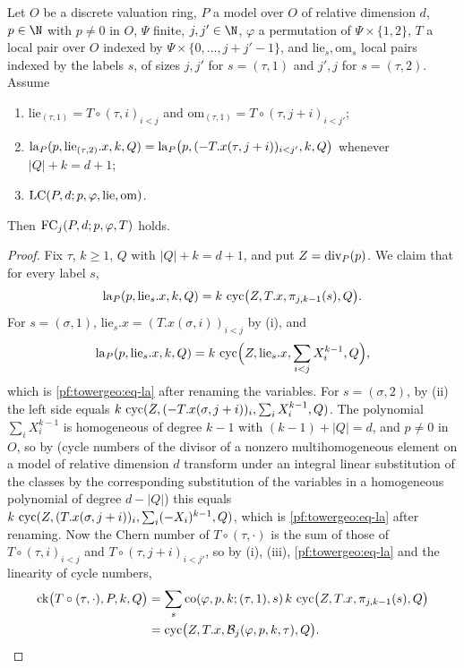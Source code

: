 \begin{lemma}\label{pf:towergeo:flag-from-labels}
Let $O$ be a discrete valuation ring, $P$ a model over $O$ of relative dimension $d$, $p\in\N$ with
$p\ne0$ in $O$, $\Psi$ finite, $j,j'\in\N$, $\varphi$ a permutation of $\Psi\times\{1,2\}$, $T$ a local pair
over $O$ indexed by $\Psi\times\{0,\dots,j+j'-1\}$, and $\mathrm{lie}_s,\mathrm{om}_s$ local pairs indexed by
the labels $s$, of sizes $j,j'$ for $s=(\tau,1)$ and $j',j$ for $s=(\tau,2)$. Assume
\begin{enumerate}[label=(\roman*)]
\item $\mathrm{lie}_{(\tau,1)}=T\circ(\tau,i)_{i<j}$ and $\mathrm{om}_{(\tau,1)}=T\circ(\tau,j+i)_{i<j'}$;
\item $\operatorname{la}_P(p,\mathrm{lie}_{(\tau,2)}.x,k,Q)=\operatorname{la}_P\bigl(p,(-T.x(\tau,j+i))_{i<j'},k,Q\bigr)$
  whenever $|Q|+k=d+1$;
\item $\mathrm{LC}(P,d;p,\varphi,\mathrm{lie},\mathrm{om})$.
\end{enumerate}
Then $\mathrm{FC}_j(P,d;p,\varphi,T)$ holds.
\end{lemma}

\begin{proof}
Fix $\tau$, $k\ge1$, $Q$ with $|Q|+k=d+1$, and put $Z=\operatorname{div}_P(p)$. We claim that for every label
$s$,
\begin{equation}\label{pf:towergeo:eq-la}
\operatorname{la}_P(p,\mathrm{lie}_s.x,k,Q)=k\,\operatorname{cyc}\bigl(Z,T.x,\pi_{j,k-1}(s),Q\bigr).
\end{equation}
For $s=(\sigma,1)$, $\mathrm{lie}_s.x=(T.x(\sigma,i))_{i<j}$ by (i), and
\[
\operatorname{la}_P(p,\mathrm{lie}_s.x,k,Q)=k\,\operatorname{cyc}\Bigl(Z,\mathrm{lie}_s.x,\sum_{i<j}X_i^{k-1},Q\Bigr),
\]
which is \eqref{pf:towergeo:eq-la} after renaming the variables. For $s=(\sigma,2)$, by (ii) the left side
equals $k\,\operatorname{cyc}(Z,(-T.x(\sigma,j+i))_i,\sum_iX_i^{k-1},Q)$. The polynomial $\sum_iX_i^{k-1}$ is
homogeneous of degree $k-1$ with $(k-1)+|Q|=d$, and $p\ne0$ in $O$, so by
 (cycle numbers of the divisor of a nonzero
multihomogeneous element on a model of relative dimension $d$ transform under an integral linear
substitution of the classes by the corresponding substitution of the variables in a homogeneous polynomial
of degree $d-|Q|$) this equals $k\,\operatorname{cyc}(Z,(T.x(\sigma,j+i))_i,\sum_i(-X_i)^{k-1},Q)$, which is
\eqref{pf:towergeo:eq-la} after renaming. Now the Chern number of $T\circ(\tau,\cdot)$ is the sum of those
of $T\circ(\tau,i)_{i<j}$ and $T\circ(\tau,j+i)_{i<j'}$, so by (i), (iii), \eqref{pf:towergeo:eq-la} and the
linearity of cycle numbers,
\begin{align*}
\operatorname{ck}\bigl(T\circ(\tau,\cdot),P,k,Q\bigr)
&=\sum_s\operatorname{co}(\varphi,p,k;(\tau,1),s)\,k\,\operatorname{cyc}\bigl(Z,T.x,\pi_{j,k-1}(s),Q\bigr)\\
&=\operatorname{cyc}\bigl(Z,T.x,\mathcal B_j(\varphi,p,k,\tau),Q\bigr).\qedhere
\end{align*}
\end{proof}

